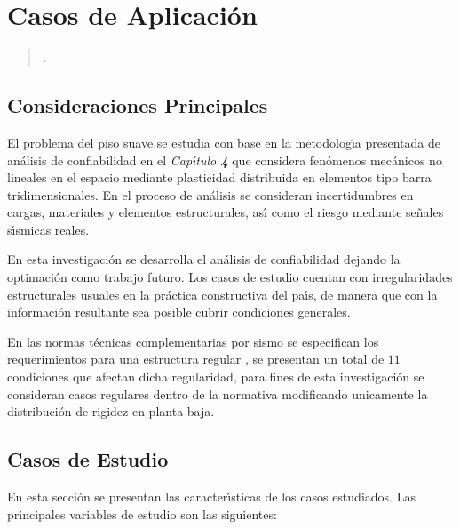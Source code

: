 
\chapter{Casos de Aplicaci\'on }

\begin{flushleft}
\begin{verse}
	\emph{.}
\bigskip\newline
\end{verse}
\end{flushleft}

\section{Consideraciones Principales}
			
El problema del piso suave se estudia con base en la metodolog\'{\i}a presentada de an\'alisis de confiabilidad en el \emph{Cap\'{\i}tulo \textbf{4}} que considera fen\'omenos mec\'anicos no lineales en el espacio mediante plasticidad distribuida en elementos tipo barra tridimensionales. En el proceso de an\'alisis se consideran incertidumbres en cargas, materiales y elementos estructurales, as\'{\i} como el riesgo mediante se\~nales s\'{\i}smicas reales.

En esta investigaci\'on se desarrolla el an\'alisis de confiabilidad dejando la optimaci\'on como trabajo futuro. Los casos de estudio cuentan con irregularidades estructurales usuales en la pr\'actica constructiva del pa\'{\i}s, de manera que con la informaci\'on resultante sea posible cubrir condiciones generales. 
		
En las normas t\'ecnicas complementarias por sismo se especifican los requerimientos para una estructura regular \cite{NTC2004}, se presentan un total de $11$ condiciones que afectan dicha regularidad, para fines de esta investigaci\'on se consideran casos regulares dentro de la normativa modificando unicamente la distribuci\'on de rigidez en planta baja.

\section{Casos de Estudio}

En esta secci\'on se presentan las caracter\'{\i}sticas de los casos estudiados. Las principales variables de estudio son las siguientes:

